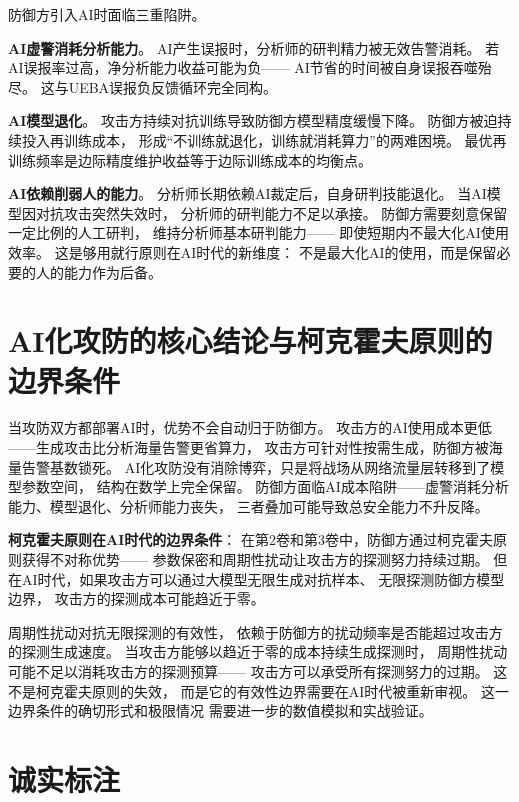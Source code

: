 \documentclass[11pt,a4paper]{article}
\begin{document}
防御方引入AI时面临三重陷阱。

\textbf{AI虚警消耗分析能力}。
AI产生误报时，分析师的研判精力被无效告警消耗。
若AI误报率过高，净分析能力收益可能为负——
AI节省的时间被自身误报吞噬殆尽。
这与UEBA误报负反馈循环完全同构。

\textbf{AI模型退化}。
攻击方持续对抗训练导致防御方模型精度缓慢下降。
防御方被迫持续投入再训练成本，
形成“不训练就退化，训练就消耗算力”的两难困境。
最优再训练频率是边际精度维护收益等于边际训练成本的均衡点。

\textbf{AI依赖削弱人的能力}。
分析师长期依赖AI裁定后，自身研判技能退化。
当AI模型因对抗攻击突然失效时，
分析师的研判能力不足以承接。
防御方需要刻意保留一定比例的人工研判，
维持分析师基本研判能力——
即使短期内不最大化AI使用效率。
这是够用就行原则在AI时代的新维度：
不是最大化AI的使用，而是保留必要的人的能力作为后备。

\section{AI化攻防的核心结论与柯克霍夫原则的边界条件}

当攻防双方都部署AI时，优势不会自动归于防御方。
攻击方的AI使用成本更低——生成攻击比分析海量告警更省算力，
攻击方可针对性按需生成，防御方被海量告警基数锁死。
AI化攻防没有消除博弈，只是将战场从网络流量层转移到了模型参数空间，
结构在数学上完全保留。
防御方面临AI成本陷阱——虚警消耗分析能力、模型退化、分析师能力丧失，
三者叠加可能导致总安全能力不升反降。

\textbf{柯克霍夫原则在AI时代的边界条件}：
在第2卷和第3卷中，防御方通过柯克霍夫原则获得不对称优势——
参数保密和周期性扰动让攻击方的探测努力持续过期。
但在AI时代，如果攻击方可以通过大模型无限生成对抗样本、
无限探测防御方模型边界，
攻击方的探测成本可能趋近于零。

周期性扰动对抗无限探测的有效性，
依赖于防御方的扰动频率是否能超过攻击方的探测生成速度。
当攻击方能够以趋近于零的成本持续生成探测时，
周期性扰动可能不足以消耗攻击方的探测预算——
攻击方可以承受所有探测努力的过期。
这不是柯克霍夫原则的失效，
而是它的有效性边界需要在AI时代被重新审视。
这一边界条件的确切形式和极限情况
需要进一步的数值模拟和实战验证。

\section{诚实标注}
\end{document}
